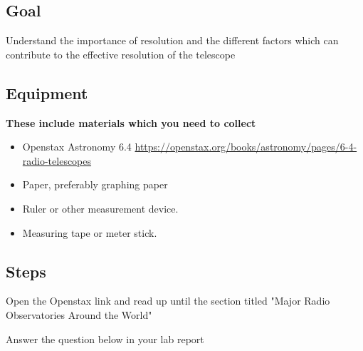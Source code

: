 \subsection{Goal}

Understand the importance of resolution and the different factors which can contribute to the effective resolution of the telescope

\subsection{Equipment}
\textbf{These include materials which you need to collect}
\begin{itemize}
	\item Openstax Astronomy 6.4 \url{https://openstax.org/books/astronomy/pages/6-4-radio-telescopes}

	\item Paper, preferably graphing paper
	
	\item Ruler or other measurement device. 
	
	\item Measuring tape or meter stick. 
\end{itemize}

\subsection{Steps}

\begin{steps}
	\item Open the Openstax link and read up until the section titled  "Major Radio Observatories Around the World" 
	 \item Answer the question below in your lab report
\end{steps}



